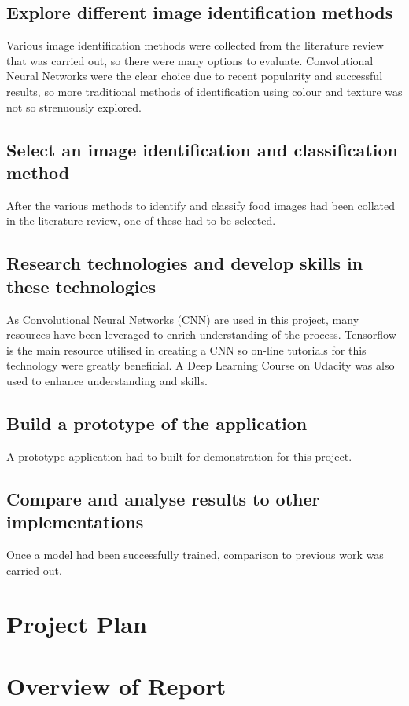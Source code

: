 \subsection*{Explore different image identification methods}
Various image identification methods were collected from the literature review
that was carried out, so there were many options to evaluate.
Convolutional Neural Networks were the clear choice due to recent popularity and successful results, so more traditional methods of identification using colour and texture was not so strenuously explored.

\subsection*{Select an image identification and classification method}
After the various methods to identify and classify food images had been collated in the literature review, one of these had to be selected.

\subsection*{Research technologies and develop skills in these technologies}
As Convolutional Neural Networks (CNN) are used in this project, many resources have been leveraged to enrich understanding of the process.
Tensorflow is the main resource utilised  in creating a CNN so on-line tutorials for this technology were greatly beneficial.
A Deep Learning Course on Udacity was also used to enhance understanding and skills.

\subsection*{Build a prototype of the application}
A prototype application had to built for demonstration for this project.

\subsection*{Compare and analyse results to other implementations}
Once a model had been successfully trained, comparison to previous work was carried out.

\section{Project Plan}

\section{Overview of Report}

